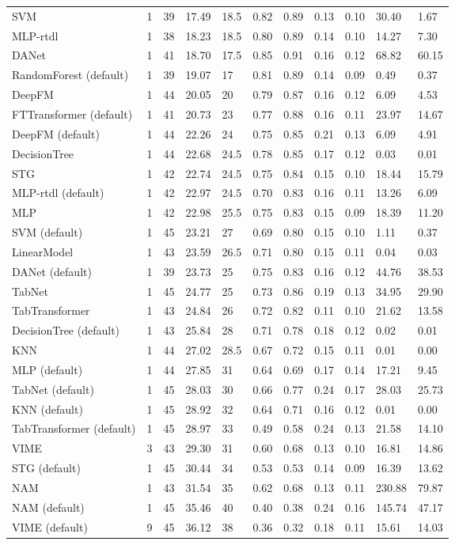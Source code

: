 \begin{tabular}{lllllllllll}
SVM & 1 & 39 & 17.49 & 18.5 & 0.82 & 0.89 & 0.13 & 0.10 & 30.40 & 1.67 \\
MLP-rtdl & 1 & 38 & 18.23 & 18.5 & 0.80 & 0.89 & 0.14 & 0.10 & 14.27 & 7.30 \\
DANet & 1 & 41 & 18.70 & 17.5 & 0.85 & 0.91 & 0.16 & 0.12 & 68.82 & 60.15 \\
RandomForest (default) & 1 & 39 & 19.07 & 17 & 0.81 & 0.89 & 0.14 & 0.09 & 0.49 & 0.37 \\
DeepFM & 1 & 44 & 20.05 & 20 & 0.79 & 0.87 & 0.16 & 0.12 & 6.09 & 4.53 \\
FTTransformer (default) & 1 & 41 & 20.73 & 23 & 0.77 & 0.88 & 0.16 & 0.11 & 23.97 & 14.67 \\
DeepFM (default) & 1 & 44 & 22.26 & 24 & 0.75 & 0.85 & 0.21 & 0.13 & 6.09 & 4.91 \\
DecisionTree & 1 & 44 & 22.68 & 24.5 & 0.78 & 0.85 & 0.17 & 0.12 & 0.03 & 0.01 \\
STG & 1 & 42 & 22.74 & 24.5 & 0.75 & 0.84 & 0.15 & 0.10 & 18.44 & 15.79 \\
MLP-rtdl (default) & 1 & 42 & 22.97 & 24.5 & 0.70 & 0.83 & 0.16 & 0.11 & 13.26 & 6.09 \\
MLP & 1 & 42 & 22.98 & 25.5 & 0.75 & 0.83 & 0.15 & 0.09 & 18.39 & 11.20 \\
SVM (default) & 1 & 45 & 23.21 & 27 & 0.69 & 0.80 & 0.15 & 0.10 & 1.11 & 0.37 \\
LinearModel & 1 & 43 & 23.59 & 26.5 & 0.71 & 0.80 & 0.15 & 0.11 & 0.04 & 0.03 \\
DANet (default) & 1 & 39 & 23.73 & 25 & 0.75 & 0.83 & 0.16 & 0.12 & 44.76 & 38.53 \\
TabNet & 1 & 45 & 24.77 & 25 & 0.73 & 0.86 & 0.19 & 0.13 & 34.95 & 29.90 \\
TabTransformer & 1 & 43 & 24.84 & 26 & 0.72 & 0.82 & 0.11 & 0.10 & 21.62 & 13.58 \\
DecisionTree (default) & 1 & 43 & 25.84 & 28 & 0.71 & 0.78 & 0.18 & 0.12 & 0.02 & 0.01 \\
KNN & 1 & 44 & 27.02 & 28.5 & 0.67 & 0.72 & 0.15 & 0.11 & 0.01 & 0.00 \\
MLP (default) & 1 & 44 & 27.85 & 31 & 0.64 & 0.69 & 0.17 & 0.14 & 17.21 & 9.45 \\
TabNet (default) & 1 & 45 & 28.03 & 30 & 0.66 & 0.77 & 0.24 & 0.17 & 28.03 & 25.73 \\
KNN (default) & 1 & 45 & 28.92 & 32 & 0.64 & 0.71 & 0.16 & 0.12 & 0.01 & 0.00 \\
TabTransformer (default) & 1 & 45 & 28.97 & 33 & 0.49 & 0.58 & 0.24 & 0.13 & 21.58 & 14.10 \\
VIME & 3 & 43 & 29.30 & 31 & 0.60 & 0.68 & 0.13 & 0.10 & 16.81 & 14.86 \\
STG (default) & 1 & 45 & 30.44 & 34 & 0.53 & 0.53 & 0.14 & 0.09 & 16.39 & 13.62 \\
NAM & 1 & 43 & 31.54 & 35 & 0.62 & 0.68 & 0.13 & 0.11 & 230.88 & 79.87 \\
NAM (default) & 1 & 45 & 35.46 & 40 & 0.40 & 0.38 & 0.24 & 0.16 & 145.74 & 47.17 \\
VIME (default) & 9 & 45 & 36.12 & 38 & 0.36 & 0.32 & 0.18 & 0.11 & 15.61 & 14.03 \\
\bottomrule
\end{tabular}
